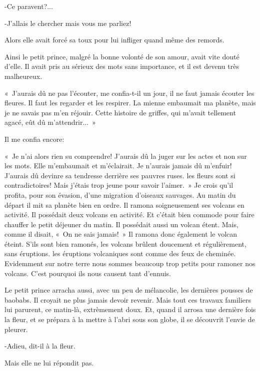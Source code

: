 \documentclass{report}
\begin{document}
-Ce paravent?...

-J'allais le chercher mais vous me parliez!

Alors elle avait forcé sa toux pour lui infliger quand même des remords.

Ainsi le petit prince, malgré la bonne volonté de son amour, avait vite douté d'elle. Il avait pris au sérieux des mots sans importance, et il est devenu très malheureux.

«~J'aurais dû ne pas l'écouter, me confia-t-il un jour, il ne faut jamais écouter les fleures. Il faut les regarder et les respirer. La mienne embaumait ma planète, mais je ne savais pas m'en réjouir. Cette histoire de griffes, qui m'avait tellement agacé, eût dû m'attendrir...~»

Il me confia encore:

«~Je n'ai alors rien su comprendre! J'aurais dû la juger sur les actes et non sur les mots. Elle m'embaumait et m'éclairait. Je n'aurais jamais dû m'enfuir! J'aurais dû devinre sa tendresse derrière ses pauvres ruses. les fleurs sont si contradictoires! Mais j'étais trop jeune pour savoir l'aimer.~»
\parachapter[IX]{} %
Je crois qu'il profita, pour son évasion, d'une migration d'oiseaux sauvages. Au matin du départ il mit sa planète bien en ordre. Il ramona soigneusement ses volcans en activité. Il possédait deux volcans en activité. Et c'était bien commode pour faire chauffer le petit déjeuner du matin. Il possédait aussi un volcan étent. Mais, comme il disait, «~On ne sais jamais!~» Il ramona donc également le volcan éteint. S'ils sont bien ramonés, les volcans brûlent doucement et régulièrement, sans éruptions. les éruptions volcaniques sont comme des feux de cheminée. Evidemment sur notre terre nous sommes beaucoup trop petits pour ramoner nos volcans. C'est pourquoi ils nous causent tant d'ennuis. 


Le petit prince arracha aussi, avec un peu de mélancolie, les dernières pousses de baobabs. Il croyait ne plus jamais devoir revenir. Mais tout ces travaux familiers lui parurent, ce matin-là, extrèmement doux. Et, quand il arrosa une dernière fois la fleur, et se prépara à la mettre à l'abri sous son globe, il se découvrit l'envie de pleurer.

-Adieu, dit-il à la fleur.

Mais elle ne lui répondit pas.
\end{document}
